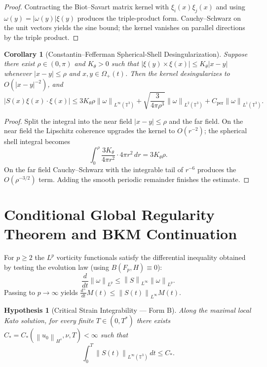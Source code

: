 \documentclass[11pt,reqno]{amsart}
\newtheorem{corollary}[theorem]{Corollary}
\newtheorem{hypothesis}[theorem]{Hypothesis}
\theoremstyle{definition}
\newcommand{\T}{\mathbb{T}^3}
\newcommand{\norm}[1]{\left\| #1 \right\|}
\newcommand{\abs}[1]{\left| #1 \right|}
\begin{document}
\begin{proof}
Contracting the Biot--Savart matrix kernel with $\xi_i(x)\xi_j(x)$ and using $\omega(y) = |\omega(y)|\xi(y)$ produces the triple-product form. Cauchy--Schwarz on the unit vectors yields the sine bound; the kernel vanishes on parallel directions by the triple product.
\end{proof}

\begin{corollary}[Constantin--Fefferman Spherical-Shell Desingularization]\label{cor:CF_bound}
Suppose there exist $\rho \in (0, \pi)$ and $K_\theta > 0$ such that $|\xi(y) \times \xi(x)| \le K_\theta |x - y|$ whenever $|x - y| \le \rho$ and $x,y \in \Omega_+(t)$. Then the kernel desingularizes to $O(|x-y|^{-2})$, and
\begin{equation}\label{eq:CF_desing}
\abs{S(x)\xi(x) \cdot \xi(x)} \le 3 K_\theta \rho \norm{\omega}_{L^\infty(\T)} + \sqrt{\frac{3}{4\pi \rho^3}} \norm{\omega}_{L^2(\T)} + C_{\mathrm{per}} \norm{\omega}_{L^1(\T)}.
\end{equation}
\end{corollary}

\begin{proof}
Split the integral into the near field $|x-y|\le\rho$ and the far field. On the near field the Lipschitz coherence upgrades the kernel to $O(r^{-2})$; the spherical shell integral becomes
\[
\int_0^\rho \frac{3K_\theta}{4\pi r^2} \cdot 4\pi r^2 \, dr = 3K_\theta\rho.
\]
On the far field Cauchy--Schwarz with the integrable tail of $r^{-6}$ produces the $O(\rho^{-3/2})$ term. Adding the smooth periodic remainder finishes the estimate.
\end{proof}

\section{Conditional Global Regularity Theorem and BKM Continuation}

For $p\ge 2$ the $L^p$ vorticity functionals satisfy the differential inequality obtained by testing the evolution law (using $B(F_p,H)\equiv 0$):
\begin{equation}\label{eq:Sp_riccati}
\frac{d}{dt} \norm{\omega}_{L^p} \le \norm{S}_{L^\infty} \norm{\omega}_{L^p}.
\end{equation}
Passing to $p\to\infty$ yields $\frac{d^+}{dt}M(t)\le\norm{S(t)}_{L^\infty}M(t)$.

\begin{hypothesis}[Critical Strain Integrability --- Form B]\label{hyp:B}
Along the maximal local Kato solution, for every finite $T\in(0,T^*)$ there exists $C_* = C_*(\norm{u_0}_{H^s},\nu,T)<\infty$ such that
\begin{equation}\label{eq:hyp_B}
\int_0^T \norm{S(t)}_{L^\infty(\T)}\, dt \le C_*.
\end{equation}
\end{hypothesis}
\end{document}
